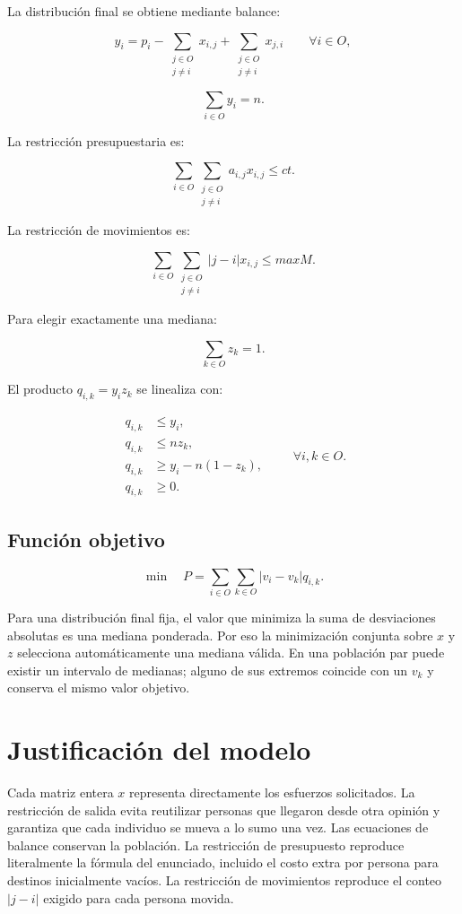 \documentclass[11pt,letterpaper]{article}
\begin{document}
La distribución final se obtiene mediante balance:

\[
y_i=p_i-\sum_{\substack{j\in O\\j\ne i}}x_{i,j}
+\sum_{\substack{j\in O\\j\ne i}}x_{j,i}
\qquad \forall i\in O,
\]

\[
\sum_{i\in O}y_i=n.
\]

La restricción presupuestaria es:

\[
\sum_{i\in O}\sum_{\substack{j\in O\\j\ne i}}
a_{i,j}x_{i,j}\le ct.
\]

La restricción de movimientos es:

\[
\sum_{i\in O}\sum_{\substack{j\in O\\j\ne i}}
|j-i|x_{i,j}\le maxM.
\]

Para elegir exactamente una mediana:

\[
\sum_{k\in O}z_k=1.
\]

El producto \(q_{i,k}=y_i z_k\) se linealiza con:

\[
\begin{aligned}
q_{i,k}&\le y_i,\\
q_{i,k}&\le nz_k,\\
q_{i,k}&\ge y_i-n(1-z_k),\\
q_{i,k}&\ge0.
\end{aligned}
\qquad \forall i,k\in O.
\]

\subsection{Función objetivo}

\[
\min \quad
P=\sum_{i\in O}\sum_{k\in O}|v_i-v_k|q_{i,k}.
\]

Para una distribución final fija, el valor que minimiza la suma de
desviaciones absolutas es una mediana ponderada. Por eso la minimización
conjunta sobre \(x\) y \(z\) selecciona automáticamente una mediana válida.
En una población par puede existir un intervalo de medianas; alguno de sus
extremos coincide con un \(v_k\) y conserva el mismo valor objetivo.

\section{Justificación del modelo}

Cada matriz entera \(x\) representa directamente los esfuerzos solicitados.
La restricción de salida evita reutilizar personas que llegaron desde otra
opinión y garantiza que cada individuo se mueva a lo sumo una vez. Las
ecuaciones de balance conservan la población. La restricción de presupuesto
reproduce literalmente la fórmula del enunciado, incluido el costo extra por
persona para destinos inicialmente vacíos. La restricción de movimientos
reproduce el conteo \(|j-i|\) exigido para cada persona movida.
\end{document}
